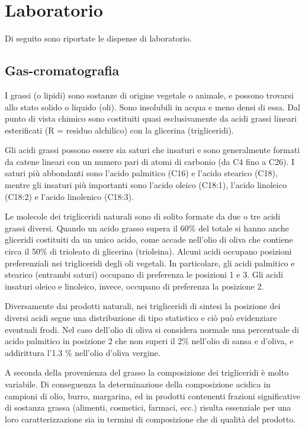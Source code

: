 
\chapter{Laboratorio}
Di seguito sono riportate le dispense di laboratorio.


\section{Gas-cromatografia}

I grassi (o lipidi) sono sostanze di origine vegetale o animale, e possono trovarsi allo stato solido o liquido (oli). Sono insolubili in acqua e meno densi di essa. Dal punto di vista chimico sono costituiti quasi esclusivamente da acidi grassi lineari esterificati (R = residuo alchilico) con la glicerina (trigliceridi).


Gli acidi grassi possono essere sia saturi che insaturi e sono generalmente formati da catene lineari con un numero pari di atomi di carbonio (da C4 fino a C26). I saturi più abbondanti sono l'acido palmitico (C16) e l'acido stearico (C18), mentre gli insaturi più importanti sono l'acido oleico (C18:1), l'acido linoleico (C18:2) e l'acido linolenico (C18:3).

Le molecole dei trigliceridi naturali sono di solito formate da due o tre acidi grassi diversi. Quando un acido grasso supera il 60\% del totale si hanno anche gliceridi costituiti da un unico acido, come accade nell'olio di oliva che contiene circa il 50\% di trioleato di glicerina (trioleina). Alcuni acidi occupano posizioni preferenziali nei trigliceridi degli oli vegetali. In particolare, gli acidi palmitico e stearico (entrambi saturi) occupano di preferenza le posizioni 1 e 3. Gli acidi insaturi oleico e linoleico, invece, occupano di preferenza la posizione 2.

Diversamente dai prodotti naturali, nei trigliceridi di sintesi la posizione dei diversi acidi segue una distribuzione di tipo statistico e ciò può evidenziare eventuali frodi. Nel caso dell'olio di oliva si considera normale una percentuale di acido palmitico in posizione 2 che non superi il 2\% nell'olio di sansa e d'oliva, e addirittura l'1.3 \% nell'olio d'oliva vergine.

A seconda della provenienza del grasso la composizione dei trigliceridi è molto variabile. Di conseguenza la determinazione della composizione acidica in campioni di olio, burro, margarina, ed in prodotti contenenti frazioni significative di sostanza grassa (alimenti, cosmetici, farmaci, ecc.) risulta essenziale per una loro caratterizzazione sia in termini di composizione che di qualità del prodotto.

